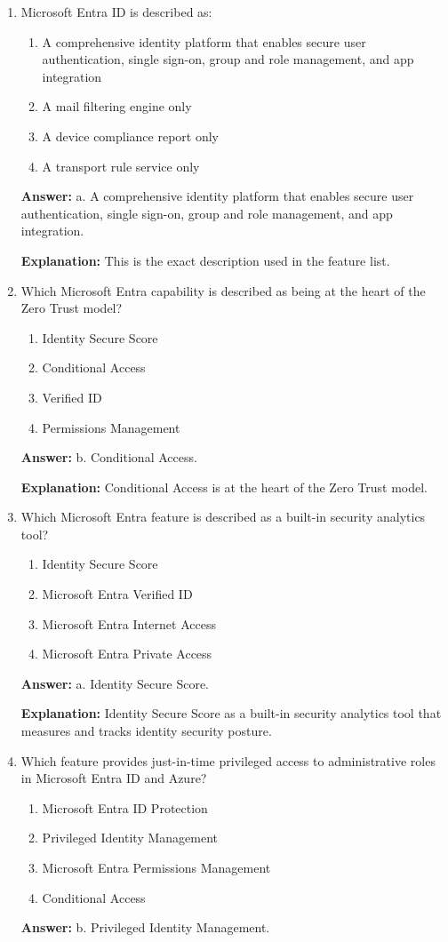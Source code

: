 \documentclass[10pt]{article}
\begin{document}
\begin{enumerate}[leftmargin=*]
\item Microsoft Entra ID is described as:
\begin{enumerate}[label=\alph*., leftmargin=1.5em]
\item A comprehensive identity platform that enables secure user authentication, single sign-on, group and role management, and app integration
\item A mail filtering engine only
\item A device compliance report only
\item A transport rule service only
\end{enumerate}
\textbf{Answer:} a. A comprehensive identity platform that enables secure user authentication, single sign-on, group and role management, and app integration.

\textbf{Explanation:} This is the exact description used in the feature list.

\item Which Microsoft Entra capability is described as being at the heart of the Zero Trust model?
\begin{enumerate}[label=\alph*., leftmargin=1.5em]
\item Identity Secure Score
\item Conditional Access
\item Verified ID
\item Permissions Management
\end{enumerate}
\textbf{Answer:} b. Conditional Access.

\textbf{Explanation:} Conditional Access is at the heart of the Zero Trust model.

\item Which Microsoft Entra feature is described as a built-in security analytics tool? 
\begin{enumerate}[label=\alph*., leftmargin=1.5em]
\item Identity Secure Score
\item Microsoft Entra Verified ID
\item Microsoft Entra Internet Access
\item Microsoft Entra Private Access
\end{enumerate}
\textbf{Answer:} a. Identity Secure Score.

\textbf{Explanation:} Identity Secure Score as a built-in security analytics tool that measures and tracks identity security posture.

\item Which feature provides just-in-time privileged access to administrative roles in Microsoft Entra ID and Azure?
\begin{enumerate}[label=\alph*., leftmargin=1.5em]
\item Microsoft Entra ID Protection
\item Privileged Identity Management
\item Microsoft Entra Permissions Management
\item Conditional Access
\end{enumerate}
\textbf{Answer:} b. Privileged Identity Management.


\end{enumerate}
\end{document}
